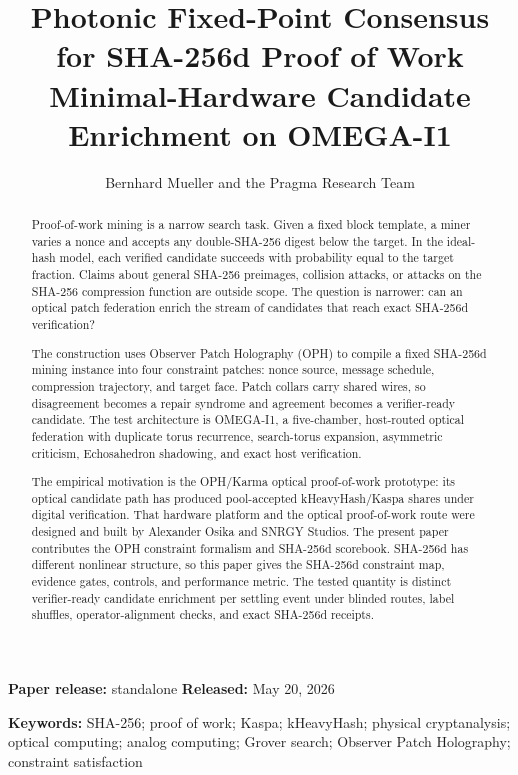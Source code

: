 \documentclass[11pt]{article}
\title{\textbf{Photonic Fixed-Point Consensus for SHA-256d Proof of Work}\\[0.25em]
\large Minimal-Hardware Candidate Enrichment on OMEGA-I1}
\author{Bernhard Mueller and the Pragma Research Team}
\date{\OPHPaperReleaseDate}
\theoremstyle{definition}
\theoremstyle{remark}
\newcommand{\OPHPaperReleaseID}{standalone}
\newcommand{\OPHPaperReleaseDate}{May 20, 2026}
\begin{document}
\maketitle
\begin{center}
\small\textbf{Paper release:} \OPHPaperReleaseID\quad
\textbf{Released:} \OPHPaperReleaseDate
\end{center}

\begin{abstract}
Proof-of-work mining is a narrow search task. Given a fixed block template, a
miner varies a nonce and accepts any double-SHA-256 digest below the target. In
the ideal-hash model, each verified candidate succeeds with probability equal
to the target fraction. Claims about general SHA-256 preimages, collision
attacks, or attacks on the SHA-256 compression function are outside scope. The
question is narrower: can an optical patch federation enrich the stream of
candidates that reach exact SHA-256d verification?

The construction uses Observer Patch Holography (OPH) to compile a fixed
SHA-256d mining instance into four constraint patches: nonce source, message
schedule, compression trajectory, and target face. Patch collars carry shared
wires, so disagreement becomes a repair syndrome and agreement becomes a
verifier-ready candidate. The test architecture is OMEGA-I1, a five-chamber,
host-routed optical federation with duplicate torus recurrence, search-torus
expansion, asymmetric criticism, Echosahedron shadowing, and exact host
verification.

The empirical motivation is the OPH/Karma optical proof-of-work prototype: its
optical candidate path has produced pool-accepted kHeavyHash/Kaspa shares under
digital verification. That hardware platform and the optical proof-of-work
route were designed and built by Alexander Osika and SNRGY Studios. The present
paper contributes the OPH constraint formalism and SHA-256d scorebook.
SHA-256d has different nonlinear structure, so this paper gives the SHA-256d
constraint map, evidence gates, controls, and performance metric. The tested
quantity is distinct verifier-ready candidate enrichment per settling event
under blinded routes, label shuffles, operator-alignment checks, and exact
SHA-256d receipts.
\end{abstract}

\noindent\textbf{Keywords:} SHA-256; proof of work; Kaspa; kHeavyHash;
physical cryptanalysis; optical computing; analog computing; Grover search;
Observer Patch Holography; constraint satisfaction
\end{document}
